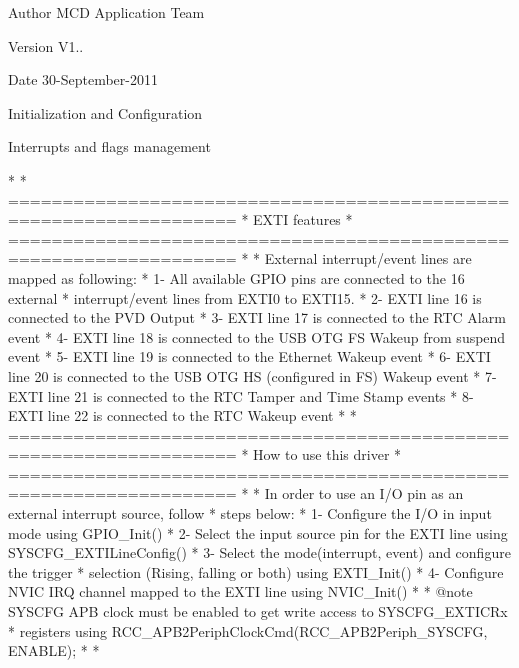 \begin{DoxyAuthor}{Author}
M\+CD Application Team 
\end{DoxyAuthor}
\begin{DoxyVersion}{Version}
V1.. 
\end{DoxyVersion}
\begin{DoxyDate}{Date}
30-\/\+September-\/2011
\begin{DoxyItemize}
\item Initialization and Configuration
\item Interrupts and flags management
\end{DoxyItemize}
\end{DoxyDate}
\begin{DoxyVerb}*  
*          ===================================================================
*                                     EXTI features
*          ===================================================================
*    
*          External interrupt/event lines are mapped as following:
*            1- All available GPIO pins are connected to the 16 external 
*               interrupt/event lines from EXTI0 to EXTI15.
*            2- EXTI line 16 is connected to the PVD Output
*            3- EXTI line 17 is connected to the RTC Alarm event
*            4- EXTI line 18 is connected to the USB OTG FS Wakeup from suspend event                                    
*            5- EXTI line 19 is connected to the Ethernet Wakeup event
*            6- EXTI line 20 is connected to the USB OTG HS (configured in FS) Wakeup event 
*            7- EXTI line 21 is connected to the RTC Tamper and Time Stamp events                                               
*            8- EXTI line 22 is connected to the RTC Wakeup event
*        
*          ===================================================================
*                                 How to use this driver
*          ===================================================================  
*              
*          In order to use an I/O pin as an external interrupt source, follow
*          steps below:
*            1- Configure the I/O in input mode using GPIO_Init()
*            2- Select the input source pin for the EXTI line using SYSCFG_EXTILineConfig()
*            3- Select the mode(interrupt, event) and configure the trigger 
*               selection (Rising, falling or both) using EXTI_Init()
*            4- Configure NVIC IRQ channel mapped to the EXTI line using NVIC_Init()
*   
*  @note  SYSCFG APB clock must be enabled to get write access to SYSCFG_EXTICRx
*         registers using RCC_APB2PeriphClockCmd(RCC_APB2Periph_SYSCFG, ENABLE);
*          
*  \end{DoxyVerb}


